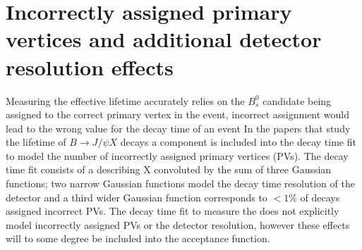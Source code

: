 \section{Incorrectly assigned primary vertices and additional detector resolution effects}
\label{sec:PVcheck}
Measuring the \bsmumu effective lifetime accurately relies on the $B^{0}_{s}$ candidate being assigned to the correct primary vertex in the event, incorrect assignment would lead to the wrong value for the decay time of an event
In the papers \cite{Aaij:2016ohx,Aaij:2015vza} that study the lifetime of $B \to J/\psi X$ decays a component is included into the decay time fit to model the number of incorrectly assigned primary vertices (PVs). The decay time fit consists of a \pdf describing X convoluted by the sum of three Gaussian functions; two narrow Gaussian functions model the decay time resolution of the detector and a third wider Gaussian function corresponds to $<1\%$ of decays assigned incorrect PVs. The decay time fit to measure the \bsmumu \el does not explicitly model incorrectly assigned PVs or the detector resolution, however these effects will to some degree be included into the acceptance function. 

